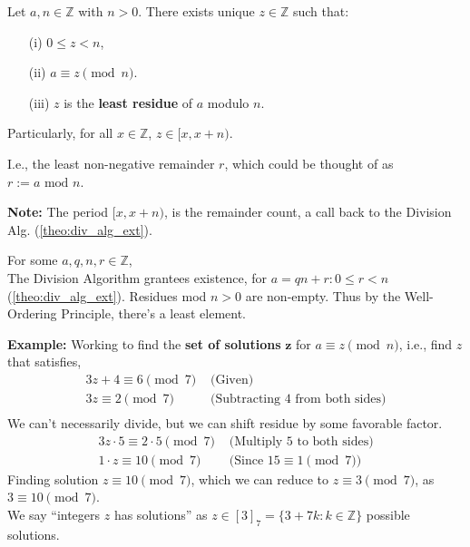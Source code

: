 \newpage

\begin{theo}

    Let \(a, n \in \mathbb{Z}\) with \(n > 0\). There exists unique $z \in \mathbb{Z}$ such that:
    \begin{itemize}
        \item [(i)] \(0 \leq z < n\),
        \item [(ii)] \(a \equiv z \pmod{n}\).
        \item [(iii)] \(z\) is the \textbf{least residue} of \(a\) modulo \(n\).
    \end{itemize}
    Particularly, for all $x\in\mathbb{Z}$, $z\in[x,x+n)$.
\end{theo}
I.e., the least non-negative remainder $r$, which could be thought of as $r:=a\text{ mod } n$.
\begin{Note}
    \textbf{Note:} The period $[x,x+n)$, is the remainder count, a call back to the Division Alg. (\ref{theo:div_alg_ext}).
\end{Note}

\begin{Proof}

    For some $a,q,n,r\in\mathbb{Z}$,\\
    The Division Algorithm grantees existence, for $a=qn+r:0\leq r<n$ (\ref{theo:div_alg_ext}). Residues 
    mod $n>0$ are non-empty. Thus by the Well-Ordering Principle, there's a least element.
\end{Proof}

\noindent
\textbf{Example:} Working to find the \textbf{set of solutions} $\mathbf{z}$ for $a\equiv z\pmod{n}$, i.e., find $z$ that satisfies,
\begin{align*}
3z+4 \equiv 6 \pmod{7} & \text{ (Given)} \\
3z \equiv 2 \pmod{7} & \text{ (Subtracting 4 from both sides)} \\
\end{align*}
We can't necessarily divide, but we can shift residue by some favorable factor.
\begin{align*}
3z\cdot5 \equiv 2\cdot5 \pmod{7} & \text{ (Multiply 5 to both sides)} \\
1\cdot z\equiv 10 \pmod{7} & \text{ (Since $15\equiv1\pmod{7}$)} 
\end{align*}
Finding solution $z\equiv10\pmod{7}$, which we can reduce to $z\equiv 3\pmod{7}$, as $3\equiv10\pmod{7}$.\\
We say ``integers $z$ has solutions'' as $z\in[3]_{7}=\{3+7k:k\in\mathbb{Z}\}$ possible solutions.\\


